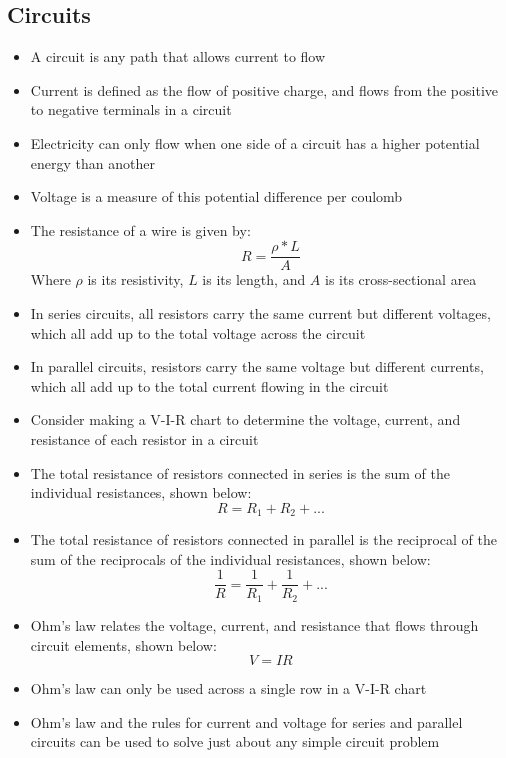 \subsection{Circuits}
\begin{itemize}
    \item A circuit is any path that allows current to flow
    \item Current is defined as the flow of positive charge, and flows from the positive to negative terminals in a circuit
    \item Electricity can only flow when one side of a circuit has a higher potential energy than another
    \item Voltage is a measure of this potential difference per coulomb
    \item The resistance of a wire is given by: \[R=\frac{\rho*L}{A}\] Where \(\rho\) is its resistivity, \(L\) is its length, and \(A\) is its cross-sectional area
    \item In series circuits, all resistors carry the same current but different voltages, which all add up to the total voltage across the circuit
    \item In parallel circuits, resistors carry the same voltage but different currents, which all add up to the total current flowing in the circuit
    \item Consider making a V-I-R chart to determine the voltage, current, and resistance of each resistor in a circuit
    \item The total resistance of resistors connected in series is the sum of the individual resistances, shown below: \[R=R_1+R_2+...\]
    \item The total resistance of resistors connected in parallel is the reciprocal of the sum of the reciprocals of the individual resistances, shown below: \[\frac{1}{R}=\frac{1}{R_1}+\frac{1}{R_2}+...\]
    \item Ohm's law relates the voltage, current, and resistance that flows through circuit elements, shown below: \[V=IR\]
    \item Ohm's law can only be used across a single row in a V-I-R chart
    \item Ohm's law and the rules for current and voltage for series and parallel circuits can be used to solve just about any simple circuit problem
\end{itemize}

